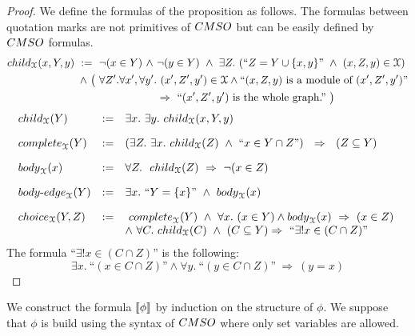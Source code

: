 \begin{proof}
We define the formulas of the proposition as follows. The formulas between quotation marks are not primitives of $\CMSO$ but can be  easily defined by $\CMSO$ formulas. 
 \begin{align*}
\mathsf{child}_\cX(x,Y,y)\ := \ \neg(x\in Y)\ \wedge\ &  \neg(y\in Y)\ \wedge\  \exists Z.\ (\text{``$Z=Y\cup\set{x,y}$''} \ \wedge\ (x,Z,y)\in \cX ) \\
\wedge\ \big(\ \forall Z'. \forall x', \forall y'.&\ (x',Z', y')\in \cX \wedge \text{``$(x,Z,y)$ is a module of $(x',Z',y')$''}\\
                    & \Rightarrow\ \text{``$(x',Z',y')$ is the whole graph.''}\ \big)
\end{align*} 
$$ 
\begin{array}{lll}
\mathsf{child}_\cX(Y) &:= &  \exists x.\ \exists y.\ \mathsf{child}_\cX(x,Y,y) \\[10pt]
\mathsf{complete}_\cX(Y)& := &  (\exists Z.\ \exists x.\ \mathsf{child}_\cX(Z)\ \wedge\ \text{``$x\in Y\cap Z$''} )\ \ \Rightarrow\ \ (Z\subseteq Y) \\[10pt]
 \mathsf{body}_\cX(x) &:= &\forall Z.\ \ \mathsf{child}_\cX(Z)\ \Rightarrow\ \neg(x\in Z) \\[10pt]
 \mathsf{body\text{-}edge}_\cX(Y)& :=& \exists x.\ \text{``$Y=\set{x}$''} \ \wedge \ \mathsf{body}_\cX(x)\\[10pt]
 \mathsf{choice}_\cX(Y,Z)&:=& \ \mathsf{complete}_\cX(Y)\ \wedge \ \forall x.\ (x\in Y)\wedge \mathsf{body}_\cX(x)\ \Rightarrow\ (x\in Z)\ \\
 && \wedge\ \forall C.\ \mathsf{child}_\cX(C)\ \wedge \ (C\subseteq Y) \Rightarrow\ 
 \text{``$\exists!  x\in (C\cap Z)$''}    
\end{array}
$$
The formula $ \text{``$\exists!  x\in (C\cap Z)$''}$ is the following:
$$ \exists x.\ \text{``$(x\in C\cap  Z)$''}\wedge \forall y.\ \text{``$(y\in C\cap Z)$''} \ \Rightarrow \ (y=x)$$
 \end{proof}
 We construct the formula $\left\llbracket {\phi}\right\rrbracket$ by induction on the structure of $\phi$. We suppose that $\phi$ is build using the syntax of $\CMSO$ where only set variables are allowed.

